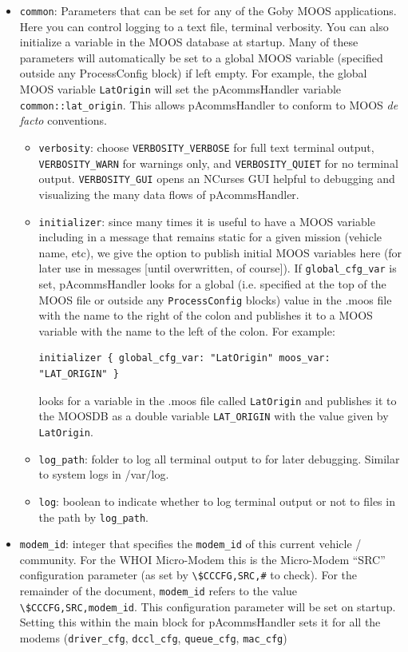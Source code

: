 \documentclass[11pt, letterpaper, oneside]{memoir}
\begin{document}
\begin{itemize}
\item \verb|common|: Parameters that can be set for any of the Goby MOOS applications. Here you can control logging to a text file, terminal verbosity. You can also initialize a variable in the MOOS database at startup. Many of these parameters will automatically be set to a global MOOS variable (specified outside any ProcessConfig block) if left empty. For example, the global MOOS variable \verb|LatOrigin| will set the pAcommsHandler variable \verb|common::lat_origin|. This allows pAcommsHandler to conform to MOOS \textit{de facto} conventions.
\begin{itemize}
\item \verb|verbosity|: choose \verb|VERBOSITY_VERBOSE| for full text terminal output, \verb|VERBOSITY_WARN| for warnings only, and \verb|VERBOSITY_QUIET| for no terminal output. \verb|VERBOSITY_GUI| opens an NCurses GUI helpful to debugging and visualizing the many data flows of pAcommsHandler. 
\item \verb|initializer|: since many times it is useful to have a MOOS variable including in a message that remains static for a given mission (vehicle name, etc), we give the option to publish initial MOOS variables here (for later use in messages [until overwritten, of course]). If \verb|global_cfg_var| is set, pAcommsHandler looks for a global (i.e. specified at the top of the MOOS file or outside any \verb|ProcessConfig| blocks) value in the .moos file with the name to the right of the colon and publishes it to a MOOS variable with the name to the left of the colon. For example:
\begin{verbatim}
initializer { global_cfg_var: "LatOrigin" moos_var: "LAT_ORIGIN" } 
\end{verbatim}
\resetbvlinenumber
looks for a variable in the .moos file called \verb|LatOrigin| and publishes it to the MOOSDB as a double variable \verb|LAT_ORIGIN| with the value given by \verb|LatOrigin|.
\item \verb|log_path|: folder to log all terminal output to for later debugging. Similar to system logs in /var/log.
\item \verb|log|: boolean to indicate whether to log terminal output or not to files in the path by \verb|log_path|.
\end{itemize}
\item \verb|modem_id|: integer that specifies the \verb|modem_id| of this current vehicle / community. For the WHOI Micro-Modem this is the Micro-Modem ``SRC'' configuration parameter (as set by \verb|\$CCCFG,SRC,#| to check). For the remainder of the document, \verb|modem_id| refers to the value \verb|\$CCCFG,SRC,modem_id|. This configuration parameter will be set on startup. Setting this within the main block for pAcommsHandler sets it for all the modems (\verb|driver_cfg|, \verb|dccl_cfg|, \verb|queue_cfg|, \verb|mac_cfg|)

\end{itemize}
\end{document}
